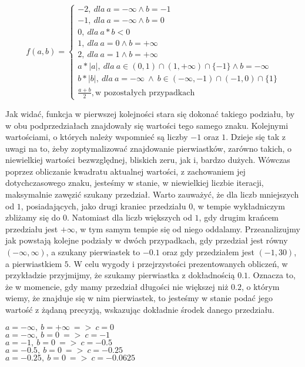 \[
f(a,b)=\left\{
\begin{array}{ll}
-2,\ dla\ a=-\infty \wedge b=-1\\
-1,\ dla\ a=-\infty \wedge b=0\\
0,\ dla\ a*b<0\\
1,\ dla\ a=0 \wedge b=+\infty\\
2,\ dla\ a=1 \wedge b=+\infty\\
a*|a|,\ dla\ a \in (0,1) \cap (1,+\infty) \cap \{-1\} \wedge b=-\infty\ \\
b*|b|,\ dla\ a=-\infty\ \wedge \ b \in (-\infty,-1) \cap (-1,0) \cap \{1\}\\
\frac{a+b}{2},\text{w pozostałych przypadkach}
\end{array}
\right.
\]

Jak widać, funkcja w pierwszej kolejności stara się dokonać takiego podziału, by w obu podprzedziałach znajdowały się wartości tego samego znaku. Kolejnymi wartościami, o których należy wspomnieć są liczby $-1$ oraz $1$. Dzieje się tak z uwagi na to, żeby zoptymalizować znajdowanie pierwiastków, zarówno takich, o niewielkiej wartości bezwzględnej, bliskich zeru, jak i, bardzo dużych. Wówczas poprzez obliczanie kwadratu aktualnej wartości, z zachowaniem jej dotychczasowego znaku, jesteśmy w stanie, w niewielkiej liczbie iteracji, maksymalnie zawęzić szukany przedział. Warto zauważyć, że dla liczb mniejszych od $1$, posiadających, jako drugi kraniec przedziału $0$, w tempie wykładniczym zbliżamy się do $0$. Natomiast dla liczb większych od $1$, gdy drugim krańcem przedziału jest $+\infty$, w tym samym tempie się od niego oddalamy. Przeanalizujmy jak powstają kolejne podziały w dwóch przypadkach, gdy przedział jest równy $(-\infty,\infty)$, a szukany pierwiastek to $-0.1$ oraz gdy przedziałem jest $(-1,30)$, a pierwiastkiem $5$. W celu wygody i przejrzystości prezentowanych obliczeń, w przykładzie przyjmijmy, że szukamy pierwiastka z dokładnością $0.1$. Oznacza to, że w momencie, gdy mamy przedział długości nie większej niż $0.2$, o którym wiemy, że znajduje się w nim pierwiastek, to jesteśmy w stanie podać jego wartość z żądaną precyzją, wskazując dokładnie środek danego przedziału.

\begin{example}
	$ $ \\
	$a = -\infty,\ b = +\infty\ =>\ c=0$ \\
	$a = -\infty,\ b = 0\ =>\ c=-1$ \\
	$a = -1,\ b = 0\ =>\ c=-0.5$ \\
	$a = -0.5,\ b = 0\ =>\ c=-0.25$ \\
	$a = -0.25,\ b = 0\ =>\ c=-0.0625$
\end{example}

